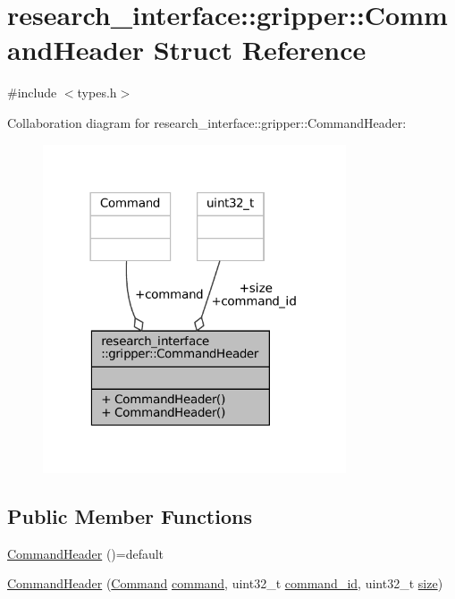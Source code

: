 \hypertarget{structresearch__interface_1_1gripper_1_1CommandHeader}{}\section{research\+\_\+interface\+:\+:gripper\+:\+:Command\+Header Struct Reference}
\label{structresearch__interface_1_1gripper_1_1CommandHeader}


{\ttfamily \#include $<$types.\+h$>$}



Collaboration diagram for research\+\_\+interface\+:\+:gripper\+:\+:Command\+Header\+:
\nopagebreak
\begin{figure}[H]
\begin{center}
\leavevmode
\includegraphics[width=254pt]{structresearch__interface_1_1gripper_1_1CommandHeader__coll__graph}
\end{center}
\end{figure}
\subsection*{Public Member Functions}
\begin{DoxyCompactItemize}
\item 
\hyperlink{structresearch__interface_1_1gripper_1_1CommandHeader_ae021f3ee2f4861ad42c2de81f32802cd}{Command\+Header} ()=default
\item 
\hyperlink{structresearch__interface_1_1gripper_1_1CommandHeader_a3a80a487a2b98033a9af58625bd1ef90}{Command\+Header} (\hyperlink{namespaceresearch__interface_1_1gripper_adeda0327764e059bac8a5f967ce41590}{Command} \hyperlink{structresearch__interface_1_1gripper_1_1CommandHeader_a5a5591a722d3dbef5999b3a4af4e6cc2}{command}, uint32\+\_\+t \hyperlink{structresearch__interface_1_1gripper_1_1CommandHeader_aa1260b5ed470826d10c918e849dc98b7}{command\+\_\+id}, uint32\+\_\+t \hyperlink{structresearch__interface_1_1gripper_1_1CommandHeader_a0f7845a3260620f694f65982da4b6610}{size})
\end{DoxyCompactItemize}
